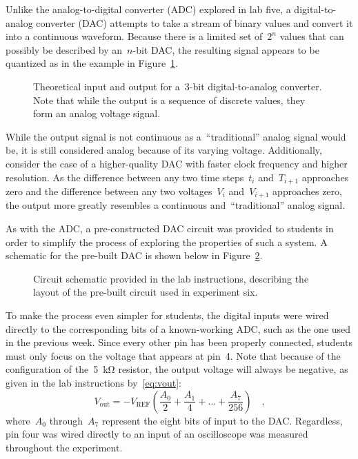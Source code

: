 Unlike the analog-to-digital converter (ADC) explored in lab five, a digital-to-analog converter (DAC) attempts to take a stream of binary values and convert it into a continuous waveform.  Because there is a limited set of~$2^n$ values that can possibly be described by an~$n$-bit DAC, the resulting signal appears to be quantized as in the example in Figure~\ref{fig:theory}.
%
\begin{figure}[H]
	\centering
	
	\parbox{.6\textwidth}{
	\caption[Theory Plot]{Theoretical input and output for a~3-bit digital-to-analog converter.  Note that while the output is a sequence of discrete values, they form an analog voltage signal.}
	\label{fig:theory}}
\end{figure}
%
While the output signal is not continuous as a~``traditional'' analog signal would be, it is still considered analog because of its varying voltage.  Additionally, consider the case of a higher-quality DAC with faster clock frequency and higher resolution.  As the difference between any two time steps~$t_i$ and~$T_{i+1}$ approaches zero and the difference between any two voltages~$V_i$ and~$V_{i+1}$ approaches zero, the output more greatly resembles a continuous and~``traditional'' analog signal.

As with the ADC, a pre-constructed DAC circuit was provided to students in order to simplify the process of exploring the properties of such a system.  A schematic for the pre-built DAC is shown below in Figure~\ref{fig:dacSchem}.
%
\begin{figure}[H]
	\centering
	
	\parbox{.6\textwidth}{
	\caption[Digital-to-Analog IC schematic]{Circuit schematic provided in the
	lab instructions, describing the layout of the pre-built circuit used in
	experiment six.}
	\label{fig:dacSchem}}
\end{figure}
%
To make the process even simpler for students, the digital inputs were wired directly to the corresponding bits of a known-working ADC, such as the one used in the previous week.  Since every other pin has been properly connected, students must only focus on the voltage that appears at pin~4.  Note that because of the configuration of the~\SI{5}{\kilo\ohm} resistor, the output voltage will always be negative, as given in the lab instructions by~\eqref{eq:vout}:
%
\begin{equation}
	V_\text{out} = - V_\text{REF} \left( \frac{A_0}{2} + \frac{A_1}{4} + \ldots + \frac{A_7}{256} \right) \quad \text{,}
	\label{eq:vout}
\end{equation}
%
where~$A_0$ through~$A_7$ represent the eight bits of input to the DAC.  Regardless, pin four was wired directly to an input of an oscilloscope was measured throughout the experiment.
